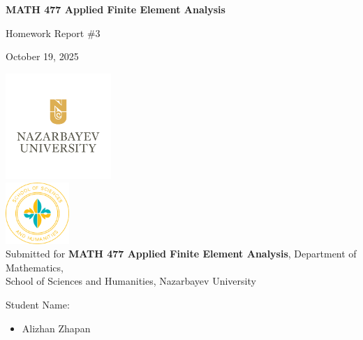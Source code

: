 \documentclass[12pt,a4paper]{article}
\begin{document}
\begin{titlepage}
  \centering
  \vspace*{0.5cm}
  {\Large\bfseries MATH 477 Applied Finite Element Analysis\par}
  \vspace{1cm}
  {\large Homework Report \#3\par}
  \vspace{0.5cm}
  {October 19, 2025\par}
  \vspace{0.7cm}
  \includegraphics[width=0.3\textwidth]{NU-logo.png}\\[0.3cm]
  \includegraphics[width=0.18\textwidth]{sosah-logo.png}\\[0.3cm]
  \vspace{0.3cm}
  Submitted for {\bf MATH 477 Applied Finite Element Analysis}, Department of Mathematics,\\
  School of Sciences and Humanities, Nazarbayev University

  \vspace{0.6cm}
  {\large Student Name:\par}
  \begin{itemize}[leftmargin=6cm]
    \item Alizhan Zhapan
  \end{itemize}
  \vspace{0.5cm}
\end{titlepage}
\end{document}
